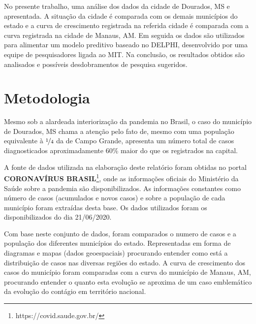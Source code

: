 \documentclass[12pt]{article}
\begin{document}
No presente trabalho, uma análise dos dados da cidade de Dourados, MS e apresentada. A situação da cidade é comparada com os demais municípios do estado e a curva de crescimento registrada na referida cidade é comparada com a curva registrada na cidade de Manaus, AM. Em seguida os dados são utilizados para alimentar um modelo preditivo baseado no DELPHI, desenvolvido por uma equipe de pesquisadores ligada ao MIT. Na conclusão, os resultados obtidos são analisados e possíveis desdobramentos de pesquisa sugeridos. 

\section{Metodologia}\label{sec:met}

Mesmo sob a alardeada interiorização da pandemia no Brasil, o caso do município de Dourados, MS chama a atenção pelo fato de, mesmo com uma população equivalente à \(\nicefrac{1}{4}\) da de Campo Grande, apresenta um número total de casos diagnosticados aproximadamente 60\% maior do que os registrados na capital.

A fonte de dados utilizada na elaboração deste relatório foram obtidas no portal \textbf{CORONAVÍRUS BRASIL}\footnote{https://covid.saude.gov.br/}, onde as informações oficiais do Ministério da Saúde sobre a pandemia são disponibilizados. As informações constantes como número de casos (acumulados e novos casos) e sobre a população de cada município foram extraídas desta base. Os dados utilizados foram os disponibilizados do dia 21/06/2020. 

Com base neste conjunto de dados, foram comparados o numero de casos e a população dos diferentes municípios do estado. Representadas em forma de diagramas e mapas (dados geoespaciais) procurando entender como está a distribuição de casos nas diversas regiões do estado. A curva de crescimento dos casos do município foram comparadas com a curva do município de Manaus, AM, procurando entender o quanto esta evolução se aproxima de um caso emblemático da evolução do contágio em território nacional.
\end{document}
